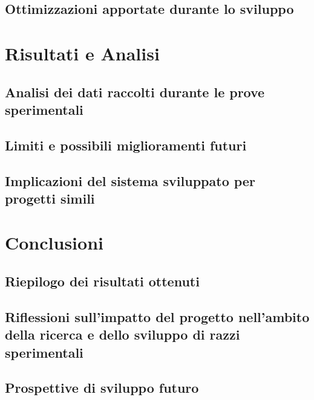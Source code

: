 \documentclass[12pt,a4paper,twoside]{book}
\begin{document}
\section{Ottimizzazioni apportate durante lo sviluppo}

\chapter{Risultati e Analisi} \label{chap:results}

\section{Analisi dei dati raccolti durante le prove sperimentali}
\section{Limiti e possibili miglioramenti futuri}
\section{Implicazioni del sistema sviluppato per progetti simili}

\chapter{Conclusioni} \label{chap:conclusion}

\section{Riepilogo dei risultati ottenuti}
\section{Riflessioni sull'impatto del progetto nell'ambito della ricerca e dello sviluppo di razzi sperimentali}
\section{Prospettive di sviluppo futuro}
\end{document}
